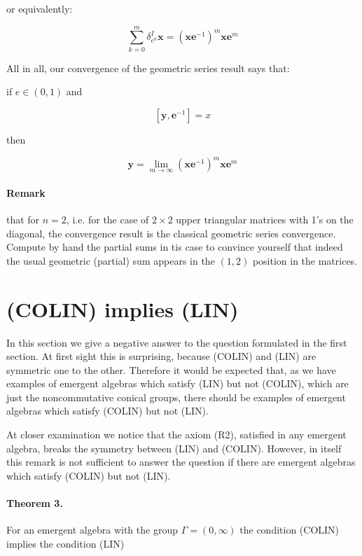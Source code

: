 \documentclass{article}
\begin{document}
or equivalently: 



$$ \sum_{k=0}^{m} \delta_{e^{k}}^{I} \mathbf{x} = (\mathbf{x} \mathbf{e}^{-1})^{m} \mathbf{x} \mathbf{e}^{m}$$



All in all, our convergence of the geometric series result says that:



 if $e \in (0,1)$ and 



$$ [\mathbf{y}, \mathbf{e}^{-1}] = x$$



then 



$$ \mathbf{y} = \lim_{m \rightarrow \infty}  (\mathbf{x} \mathbf{e}^{-1})^{m} \mathbf{x} \mathbf{e}^{m}$$



\paragraph{Remark} that for $n=2$, i.e. for the case of $2 \times 2$ upper triangular matrices with 1's on the diagonal, the convergence result is the classical geometric series convergence. Compute by hand the partial sums in tis case to convince yourself that indeed the usual geometric (partial) sum appears in the $(1,2)$ position in the matrices. 



\section{(COLIN) implies (LIN)}

In this section we give a negative answer to the question formulated in the first section. At first sight this is surprising, because (COLIN) and (LIN) are symmetric one to the other. Therefore it would be expected that, as we have examples of emergent algebras which satisfy (LIN) but not (COLIN), which are just the noncommutative conical groups, there should be examples of emergent algebras which satisfy (COLIN) but not (LIN). 

At closer examination we notice that the axiom (R2), satisfied in any emergent algebra, breaks the symmetry between (LIN) and (COLIN). However, in itself this remark is not sufficient to answer the question if there are emergent algebras which satisfy (COLIN) but not (LIN).

\paragraph{Theorem 3.} For an emergent algebra with the group $\Gamma = (0,\infty)$ the condition (COLIN) implies the condition (LIN)
\end{document}
